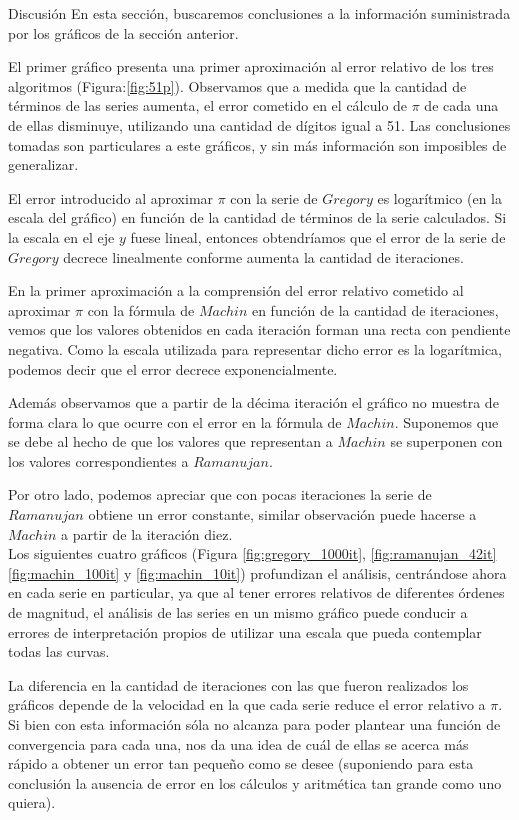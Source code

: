 \begin{section}{Discusión}
	En esta sección, buscaremos conclusiones a la información suministrada por los gráficos de la sección anterior.
	
	El primer gráfico presenta una primer aproximación al error relativo de los tres algoritmos (Figura:\ref{fig:51p}).
	Observamos que a medida que la cantidad de términos de las series aumenta, el error cometido en el cálculo de $\pi$ de cada una de ellas disminuye, utilizando una cantidad de dígitos igual a 51. Las conclusiones tomadas son particulares a este gráficos, y sin más información son imposibles de generalizar.
	
	El error introducido al aproximar $\pi$ con la serie de $Gregory$ es logarítmico (en la escala del gráfico) en función de la cantidad de términos de la serie calculados. Si la escala en el eje $y$ fuese lineal, entonces obtendríamos que el error de la serie de $Gregory$ decrece linealmente conforme aumenta la cantidad de iteraciones.
	
	En la primer aproximación a la comprensión del error relativo cometido al aproximar $\pi$ con la fórmula de $Machin$ en función de la cantidad de iteraciones, vemos que los valores obtenidos en cada iteración forman una recta con pendiente negativa. Como la escala utilizada para representar dicho error es la logarítmica, podemos decir que el error decrece exponencialmente.
	
	Además observamos que a partir de la décima iteración el gráfico no muestra de forma clara lo que ocurre con el error en la fórmula de $Machin$. Suponemos que se debe al hecho de que los valores que representan a $Machin$ se superponen con los valores correspondientes a $Ramanujan$.
	
	Por otro lado, podemos apreciar que con pocas iteraciones la serie de $Ramanujan$ obtiene un error constante, similar observación puede hacerse a $Machin$ a partir de la iteración diez.\\
	
	Los siguientes cuatro gráficos (Figura \ref{fig:gregory_1000it}, \ref{fig:ramanujan_42it} \ref{fig:machin_100it} y \ref{fig:machin_10it}) profundizan el análisis, centrándose ahora en cada serie en particular, ya que al tener errores relativos de diferentes órdenes de magnitud, el análisis de las series en un mismo gráfico puede conducir a errores de interpretación propios de utilizar una escala que pueda contemplar todas las curvas.
	
	La diferencia en la cantidad de iteraciones con las que fueron realizados los gráficos depende de la velocidad en la que cada serie reduce el error relativo a $\pi$. Si bien con esta información sóla no alcanza para poder plantear una función de convergencia para cada una, nos da una idea de cuál de ellas se acerca más rápido a obtener un error tan pequeño como se desee (suponiendo para esta conclusión la ausencia de error en los cálculos y aritmética tan grande como uno quiera).
	

\end{section}
